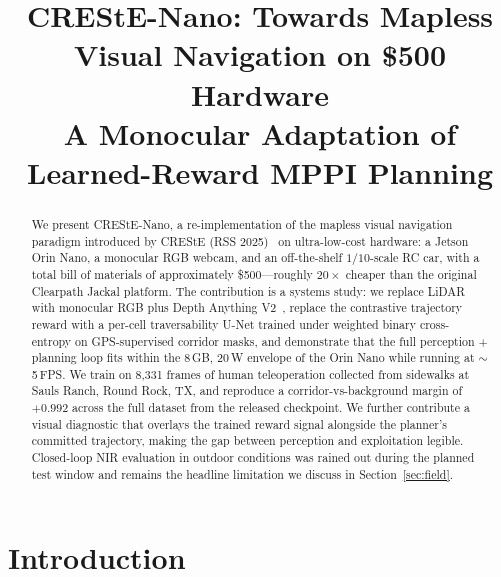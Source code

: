\documentclass[conference]{IEEEtran}
\begin{document}
\title{CREStE-Nano: Towards Mapless Visual Navigation on \$500 Hardware\\
\large{A Monocular Adaptation of Learned-Reward MPPI Planning}}

\author{
\and
{}
}

\maketitle

\begin{abstract}
We present CREStE-Nano, a re-implementation of the mapless visual navigation
paradigm introduced by CREStE (RSS 2025)~\cite{creste} on ultra-low-cost
hardware: a Jetson Orin Nano, a monocular RGB webcam, and an off-the-shelf
$1/10$-scale RC car, with a total bill of materials of approximately
\$500---roughly $20\times$ cheaper than the original Clearpath Jackal
platform. The contribution is a systems study: we replace LiDAR with
monocular RGB plus Depth Anything V2~\cite{depth_anything}, replace the
contrastive trajectory reward with a per-cell traversability U-Net trained
under weighted binary cross-entropy on GPS-supervised corridor masks, and
demonstrate that the full perception + planning loop fits within the 8\,GB,
20\,W envelope of the Orin Nano while running at $\sim$5\,FPS. We train on
8{,}331 frames of human teleoperation collected from sidewalks at Sauls
Ranch, Round Rock, TX, and reproduce a corridor-vs-background margin of
$+0.992$ across the full dataset from the released checkpoint. We further
contribute a visual diagnostic that overlays the trained reward signal
alongside the planner's committed trajectory, making the gap between
perception and exploitation legible. Closed-loop NIR evaluation in
outdoor conditions was rained out during the planned test window and
remains the headline limitation we discuss in
Section~\ref{sec:field}.
\end{abstract}

\section{Introduction}
\label{sec:intro}
\end{document}
